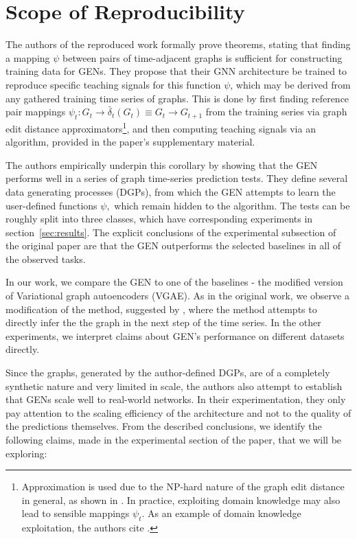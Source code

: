 \section{Scope of Reproducibility}
\label{sec:claims}

The authors of the reproduced work formally prove theorems, stating that finding a mapping $\psi$ between pairs of time-adjacent graphs is sufficient for constructing training data for GENs. 
They propose that their GNN architecture be trained to reproduce specific teaching signals for this function $\psi$, which may be derived from any gathered training time series of graphs. 
This is done by first finding reference pair mappings $\psi_{t}: G_{t} \to \bar{\delta}_{t}(G_{t}) \equiv G_{t} \to G_{t+1}$ from the training series via graph edit distance approximators\footnote{Approximation is used due to the NP-hard nature of the graph edit distance in general, as shown in \cite{bougleux2017graph}. In practice, exploiting domain knowledge may also lead to sensible mappings $\psi_{t}$. As an example of domain knowledge exploitation, the authors cite \cite{zhang1989simple}.}, and then computing teaching signals via an algorithm, provided in the paper's supplementary material. 

The authors empirically underpin this corollary by showing that the GEN performs well in a series of graph time-series prediction tests. They define several data generating processes (DGPs), from which the GEN attempts to learn the user-defined functions $\psi,$ which remain hidden to the algorithm. The tests can be roughly split into three classes, which have corresponding experiments in section~\ref{sec:results}. The explicit conclusions of the experimental subsection of the original paper are that the GEN outperforms the selected baselines in all of the observed tasks. 

In our work, we compare the GEN to one of the baselines - the modified version of Variational graph autoencoders (VGAE). As in the original work, we observe a modification of the method, suggested by \cite{VGRNN}, where the method attempts to directly infer the the graph in the next step of the time series. In the other experiments, we interpret claims about GEN's performance on different datasets directly.


Since the graphs, generated by the author-defined DGPs, are of a completely synthetic nature and very limited in scale, the authors also attempt to establish that GENs scale well to real-world networks. In their experimentation, they only pay attention to the scaling efficiency of the architecture and not to the quality of the predictions themselves. From the described conclusions, we identify the following claims, made in the experimental section of the paper, that we will be exploring:

